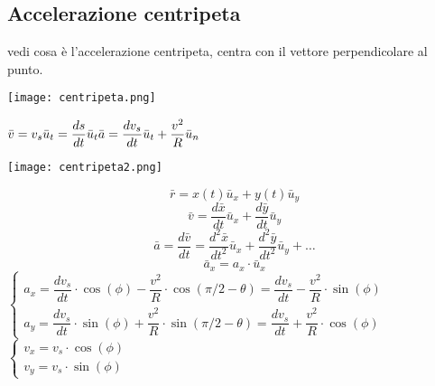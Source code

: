 \documentclass[../../main.tex]{subfiles}
\begin{document}
\subsection{Accelerazione centripeta}
vedi cosa è l'accelerazione centripeta, centra con il vettore perpendicolare al punto.
\begin{minipage}{0.5\textwidth}
    \centering
    \texttt{[image: centripeta.png]}
\end{minipage}
\begin{minipage}{0.5\textwidth}
    $\bar v = v_s \bar u_t = \dfrac{ds}{dt}\bar u_t \\
        \bar a = \dfrac{dv_s}{dt}\bar u_t + \dfrac{v^2}{R}\bar u_n$
\end{minipage}
\vspace*{2pt}
\begin{minipage}{0.5\textwidth}
    \centering
    \texttt{[image: centripeta2.png]}
\end{minipage}
\begin{minipage}{0.5\textwidth}
    \[
        \bar r = x(t) \bar u_x + y(t) \bar u_y
    \]
    \[
        \bar v = \dfrac{d\bar x}{dt}\bar u_x + \dfrac{d\bar y}{dt}\bar u_y
    \]
    \[
        \bar a = \dfrac{d\bar v}{dt} = \dfrac{d^2\bar x}{dt^2}\bar u_x + \dfrac{d^2\bar y}{dt^2}\bar u_y + \ldots
    \]
    \[
        \bar a_x = a_x \cdot \bar{u}_x
    \]
    $\begin{cases}
            a_x = \dfrac{dv_s}{dt}\cdot \cos(\phi) - \dfrac{v^2}{R}\cdot\cos(\pi/2 - \theta) = \dfrac{dv_s}{dt} - \dfrac{v^2}{R}\cdot\sin(\phi) \\
            a_y = \dfrac{dv_s}{dt}\cdot \sin(\phi) + \dfrac{v^2}{R}\cdot\sin(\pi/2 - \theta) = \dfrac{dv_s}{dt} + \dfrac{v^2}{R}\cdot\cos(\phi)
        \end{cases}$
    $\begin{cases}
            v_x = v_s\cdot \cos(\phi) \\
            v_y = v_s\cdot \sin(\phi)
        \end{cases}$
\end{minipage}
\end{document}
